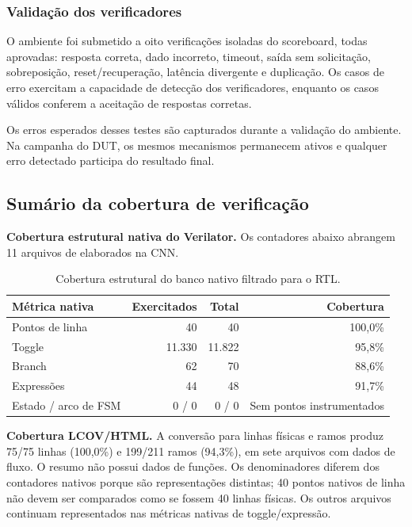 \documentclass[12pt,a4paper]{article}
\newcommand{\arquivo}[1]{\texttt{\detokenize{#1}}}
\begin{document}
\subsubsection{Validação dos verificadores}
O ambiente foi submetido a oito verificações isoladas do scoreboard, todas aprovadas: resposta correta, dado incorreto, timeout, saída sem solicitação, sobreposição, reset/recuperação, latência divergente e duplicação. Os casos de erro exercitam a capacidade de detecção dos verificadores, enquanto os casos válidos conferem a aceitação de respostas corretas.

Os erros esperados desses testes são capturados durante a validação do ambiente. Na campanha do DUT, os mesmos mecanismos permanecem ativos e qualquer erro detectado participa do resultado final.

\subsection{Sumário da cobertura de verificação}
\textbf{Cobertura estrutural nativa do Verilator.} Os contadores abaixo abrangem 11 arquivos de \arquivo{src} elaborados na CNN.

\begin{table}[H]\centering\small
\begin{tabular}{p{8cm}rrr}\toprule
\textbf{Métrica nativa} & \textbf{Exercitados} & \textbf{Total} & \textbf{Cobertura}\\\midrule
Pontos de linha & 40 & 40 & 100,0\%\\
Toggle & 11.330 & 11.822 & 95,8\%\\
Branch & 62 & 70 & 88,6\%\\
Expressões & 44 & 48 & 91,7\%\\
Estado / arco de FSM & 0 / 0 & 0 / 0 & Sem pontos instrumentados\\\bottomrule
\end{tabular}
\caption{Cobertura estrutural do banco nativo filtrado para o RTL.}
\end{table}

\textbf{Cobertura LCOV/HTML.} A conversão para linhas físicas e ramos produz 75/75 linhas (100,0\%) e 199/211 ramos (94,3\%), em sete arquivos com dados de fluxo. O resumo não possui dados de funções. Os denominadores diferem dos contadores nativos porque são representações distintas; 40 pontos nativos de linha não devem ser comparados como se fossem 40 linhas físicas. Os outros arquivos continuam representados nas métricas nativas de toggle/expressão.
\end{document}
